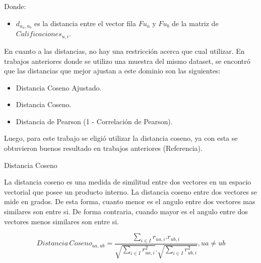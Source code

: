 \documentclass[11pt,a4paper,twoside]{thesis}
\begin{document}
\begin{description}
	\item[Donde:]
\end{description}
\begin{itemize}
	\item $d_{u_a,u_b}$ es la distancia entre el vector fila $F{u_a}$ y $F{u_b}$ de la matriz de $Calificaciones_{u,i}$.
\end{itemize}


En cuanto a las distancias, no hay una restricción acerca que cual utilizar. En trabajos anteriores donde se utilizo una muestra del 
mismo dataset, se encontró que las distancias que mejor ajustan a este dominio son las siguientes:

\begin{itemize}
	\item Distancia Coseno Ajustado.
	\item Distancia Coseno.
	\item Distancia de Pearson (1 - Correlación de Pearson).
\end{itemize}

Luego, para este trabajo se eligió utilizar la distancia coseno, ya con esta se obtuvieron buenos resultado en trabajos anteriores (Referencia).

\begin{description}
	\item[Distancia Coseno]
\end{description}

La distancia coseno es una medida de similitud entre dos vectores en un espacio vectorial que posee un producto interno. La distancia coseno entre dos vectores se mide en grados. 
De esta forma, cuanto menor es el angulo entre dos vectores mas similares son entre si. De forma contraria, cuando mayor es el angulo entre dos vectores menos similares son entre si.

\begin{equation*}
	Distancia \mspace{3mu}Coseno_{ua, ub} = \frac{ \sum_{i \in I} r_{ua, i}.r_{ub, i}}{\sqrt{\sum_{i \in I} r_{ua, i}^2}.\sqrt{\sum_{i \in I} r_{ub, i}^2}  }, ua \neq ub
\end{equation*}
\end{document}
